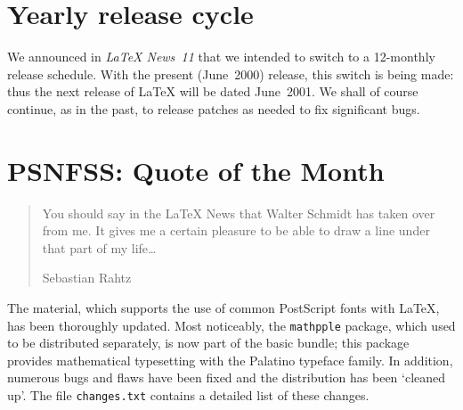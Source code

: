 \documentclass{ltnews}
\providecommand\pkg[1]{\texttt{#1}}
\providecommand\file[1]{\texttt{#1}}
\begin{document}
\maketitle

\raisefirstsection
\section{Yearly release cycle}

We  announced in \textit{\LaTeX{} News~11} that we intended to switch
to a 12-monthly release schedule.  With the present (June~2000)
release, this switch is being made: thus the next release of \LaTeX{}
will be dated June~2001.  We shall of course continue, as in the past,
to release patches as needed to fix significant bugs.

  \begin{latexonly}
    \vspace{-0.2\baselineskip}
    \enlargethispage{\baselineskip}
  \end{latexonly}

\section{PSNFSS: \small Quote of the Month}

\begin{quote}
  You should say in the \LaTeX{} News that Walter Schmidt has taken over
  \PSNFSS{} from me. It gives me a certain pleasure to be able to draw a
  line under that part of my life\ldots

  \begin{latexonly}
    \vspace{-\baselineskip}
  \end{latexonly}

  \begin{flushright}
    Sebastian Rahtz
  \end{flushright}
\end{quote}

\begin{latexonly}
  \vspace{-\baselineskip}
\end{latexonly}

\noindent
The \PSNFSS{} material, which supports the use\latex{\\}
of common PostScript fonts with \LaTeX{}, has been thoroughly updated.
Most noticeably, the \pkg{mathpple} package, which used to be
distributed separately, is now part of the basic \PSNFSS{} bundle;
this package provides mathematical typesetting with the Palatino
typeface family.  In addition, numerous bugs and flaws have been fixed
and the distribution has been `cleaned up'.  The file
\file{changes.txt} contains a detailed list of these changes.
\end{document}
